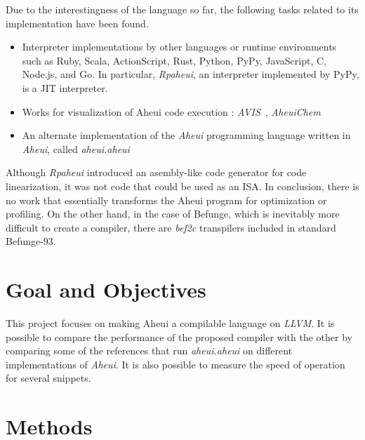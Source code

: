 Due to the interestingness of the language so far, the following tasks related to its implementation have been found.

\begin{itemize}
\item Interpreter implementations by other languages or runtime environments~\cite{aheui_projects} such as Ruby, Scala, ActionScript, Rust, Python, PyPy, JavaScript, C, Node.js, and Go. In particular, \textit{Rpaheui}, an interpreter implemented by PyPy, is a JIT interpreter.
\item Works for visualization of Aheui code execution : \textit{AVIS}~\cite{avis}, \textit{AheuiChem}~\cite{aheuichem}
\item An alternate implementation of the \textit{Aheui} programming language written in \textit{Aheui}, called \textit{aheui.aheui}~\cite{aheuiaheui}
\end{itemize}

Although \textit{Rpaheui} introduced an asembly-like code generator for code linearization, it was not code that could be used as an ISA. In conclusion, there is no work that essentially transforms the Aheui program for optimization or profiling. On the other hand, in the case of Befunge, which is inevitably more difficult to create a compiler, there are \textit{bef2c} transpilers included in standard Befunge-93.

\section*{Goal and Objectives}

This project focuses on making Aheui a compilable language on \textit{LLVM}. It is possible to compare the performance of the proposed compiler with the other by comparing some of the references that run \textit{aheui.aheui} on different implementations of \textit{Aheui}. It is also possible to measure the speed of operation for several snippets.

\section*{Methods}

